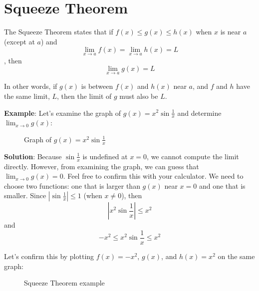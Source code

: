 \section{Squeeze Theorem}

The Squeeze Theorem states that if $f(x) \leq g(x) \leq h(x)$ when $x$ is near $a$ 
(except at $a$) and $$\lim_{x \to a}f(x)=\lim_{x \to a}h(x) = L$$, then $$\lim_{x 
\to a}g(x) = L$$

In other words, if $g(x)$ is between $f(x)$ and $h(x)$ near $a$, and $f$ and $h$ have the 
same limit, $L$, then the limit of $g$ must also be $L$. 

\textbf{Example}: Let's examine the graph of $g(x) = x^2\sin{\frac{1}{x}}$ and determine $\lim_{x \to 
0}g(x)$:

\begin{figure}[htbp]
\centering
{}
\caption{Graph of $g(x) = x^2\sin{\frac{1}{x}}$}
\end{figure}

\textbf{Solution}: Because $\sin{\frac{1}{x}}$ is undefined at $x=0$, we cannot 
compute the limit directly. However, from examining the graph, we can guess 
that $\lim_{x \to 0} g(x) = 0$. Feel free to confirm this with your calculator. 
We need to choose two functions: one that is larger than $g(x)$ near $x = 0$ 
and one that is smaller. Since $|\sin{\frac{1}{x}}|\leq 1$ (when $x \neq 0$), 
then $$|x^2 \sin{\frac{1}{x}}| \leq x^2$$ and $$-x^2 \leq x^2 \sin{\frac{1}{x}} 
\leq x^2$$

Let's confirm this by plotting $f(x)=-x^2$, $g(x)$, and $h(x)=x^2$ on the same 
graph:

\begin{figure}[htbp]
\centering

\caption{Squeeze Theorem example}
\end{figure}

